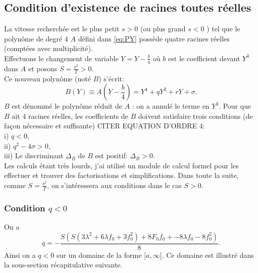 \documentclass[11pt]{article}
\begin{document}
\subsection{Condition d'existence de racines toutes réelles}
La vitesse recherchée est le plus petit $s>0$ (ou plus grand $s<0$ ) tel que le polynôme de degré 4 $A$ défini dans \ref{eq:PY} possède quatre racines réelles (comptées avec multiplicité).\\ 
Effectuons le changement de variable $Y= Y-\frac{b}{4}$ où $b$ est le coefficient devant $Y^3$ dans $A$ et posons $S= \frac{s^2}{T}>0$.\\
 Ce nouveau polynôme (noté $B$) s'écrit: \begin{equation}
	B(Y) \equiv A(Y-\frac{b}{4}) = Y^4 + qY^2 + r Y + \sigma.
\end{equation}
$B$ est dénommé le polynôme réduit de $A$ : on a annulé le terme en $Y^3$.
Pour que $B$ ait 4 racines réelles, les coefficients de $B$ doivent satisfaire trois conditions (de façon nécessaire et suffisante) CITER EQUATION D'ORDRE 4:\\
i) $q<0$,\\
ii) $q^2-4\sigma>0$,\\
iii) Le discriminant $\Delta_B$ de $B$ est positif: $\Delta_B>0$.\\
Les calculs étant très lourds, j'ai utilisé un module de calcul formel pour les effectuer et trouver des factorisations et simplifications. Dans toute la suite, comme $S= \frac{s^2}{T}$, on s’intéressera aux conditions dans le cas $S>0$.
\subsubsection{Condition $q<0$}
On a \begin{equation} q = - \frac{S \left( S \left(3 \lambda^{2} + 6 \lambda f_{0} + 3 f_{0}^{2}\right)+ 8 F_{0} f_{0} + - 8 \lambda f_{0} - 8 f_{0}^{2}\right)}{8}. \end{equation}
Ainsi on a $q<0$ sur un domaine de la forme $[a,\infty[$. Ce domaine est illustré dans la sous-section récapitulative suivante.

\newpage
\end{document}
